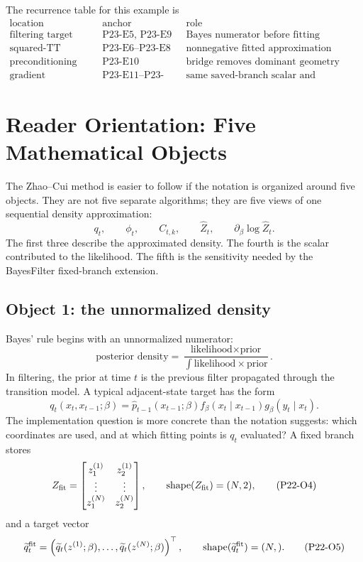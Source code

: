 \documentclass[11pt]{article}
\newcommand{\shape}{\operatorname{shape}}
\begin{document}
The recurrence table for this example is
\[
\begin{array}{lll}
\text{location} & \text{anchor} & \text{role}\\
\hline
\text{filtering target} & \text{P23-E5, P23-E9} &
    \text{Bayes numerator before fitting}\\
\text{squared-TT density} & \text{P23-E6--P23-E8} &
    \text{nonnegative fitted approximation}\\
\text{preconditioning} & \text{P23-E10} &
    \text{bridge removes dominant geometry}\\
\text{gradient} & \text{P23-E11--P23-E12} &
    \text{same saved-branch scalar and derivative.}
\end{array}
\tag{P23-E13}
\]

\section{Reader Orientation: Five Mathematical Objects}

The Zhao--Cui method is easier to follow if the notation is organized around
five objects.  They are not five separate algorithms; they are five views of
one sequential density approximation:
\[
    q_t,\qquad \phi_t,\qquad C_{t,k},\qquad \widehat Z_t,
    \qquad \partial_\beta\log\widehat Z_t .
    \tag{P22-O1}
\]
The first three describe the approximated density.  The fourth is the scalar
contributed to the likelihood.  The fifth is the sensitivity needed by the
BayesFilter fixed-branch extension.

\subsection*{Object 1: the unnormalized density}

Bayes' rule begins with an unnormalized numerator:
\[
    \text{posterior density}
    =
    \frac{\text{likelihood}\times\text{prior}}
    {\int \text{likelihood}\times\text{prior}}.
    \tag{P22-O2}
\]
In filtering, the prior at time \(t\) is the previous filter propagated through
the transition model.  A typical adjacent-state target has the form
\[
    q_t(x_t,x_{t-1};\beta)
    =
    \widehat p_{t-1}(x_{t-1};\beta)
    f_\beta(x_t\mid x_{t-1})
    g_\beta(y_t\mid x_t).
    \tag{P22-O3}
\]
The implementation question is more concrete than the notation suggests:
which coordinates are used, and at which fitting points is \(q_t\) evaluated?
A fixed branch stores
\[
    Z_{\rm fit}
    =
    \begin{bmatrix}
    z_1^{(1)} & z_2^{(1)}\\
    \vdots & \vdots\\
    z_1^{(N)} & z_2^{(N)}
    \end{bmatrix},
    \qquad
    \shape(Z_{\rm fit})=(N,2),
    \tag{P22-O4}
\]
and a target vector
\[
    \widetilde q_t^{\rm fit}
    =
    \left(
    \widetilde q_t(z^{(1)};\beta),\ldots,
    \widetilde q_t(z^{(N)};\beta)
    \right)^\top,
    \qquad
    \shape(\widetilde q_t^{\rm fit})=(N,).
    \tag{P22-O5}
\]
\end{document}
